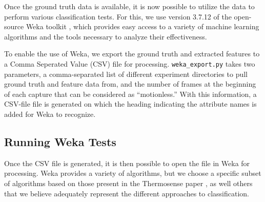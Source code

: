 \documentclass[../thesis/thesis.tex]{subfiles}
\begin{document}
Once the ground truth data is available, it is now possible to utilize the data to perform various classification tests. For this, we use version 3.7.12 of the open-source Weka toolkit \cite{Weka}, which provides easy access to a variety of machine learning algorithms and the tools necessary to analyze their effectiveness.

To enable the use of Weka, we export the ground truth and extracted features to a Comma Seperated Value (CSV) file for processing. \texttt{weka\_export.py} takes two parameters, a comma-separated list of different experiment directories to pull ground truth and feature data from, and the number of frames at the beginning of each capture that can be considered as ``motionless.'' With this information, a CSV-file file is generated on which the heading indicating the attribute names is added for Weka to recognize.

\subsection{Running Weka Tests}
Once the CSV file is generated, it is then possible to open the file in Weka for processing. Weka provides a variety of algorithms, but we choose a specific subset of algorithms based on those present in the Thermosense paper \cite{beltran2013thermosense}, as well others that we believe adequately represent the different approaches to classification.
\end{document}
